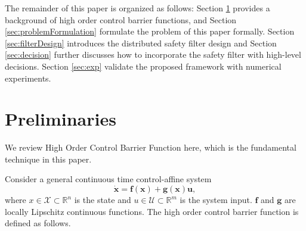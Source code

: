 \documentclass{ifacconf}
\begin{document}
\par The remainder of this paper is organized as follows: Section \ref{sec:preliminariy} provides a background of high order control barrier functions, and Section \ref{sec:problemFormulation} formulate the problem of this paper formally.
Section \ref{sec:filterDesign} introduces the distributed safety filter design and Section \ref{sec:decision} further discusses how to incorporate the safety filter with high-level decisions.
Section \ref{sec:exp} validate the proposed framework with numerical experiments.


\section{Preliminaries}\label{sec:preliminariy}
\par We review High Order Control Barrier Function here, which is the fundamental technique in this paper.

Consider a general continuous time control-affine system
\begin{equation} \label{eqn:system}
  \dot{\boldsymbol{x}} = \boldsymbol{f}(\boldsymbol{x}) + \boldsymbol{g}(\boldsymbol{x}) \boldsymbol{u} ,
\end{equation}
where $x \in \mathcal{X} \subset \mathbb{R}^n$ is the state and $u \in \mathcal{U} \subset \mathbb{R}^m$ is the system input. $\boldsymbol{f}$ and $\boldsymbol{g}$ are locally Lipschitz continuous functions. The high order control barrier function is defined as follows.
\end{document}
